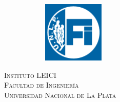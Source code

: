 \begin{titlepage}
\begin{center}
\begin{figure}[H]
\begin{subfigure}
                \end{subfigure}
                \begin{subfigure}
                    \centering
                    \includegraphics[width=0.32\textwidth]{Imagenes/FI Invertido.png}
                \end{subfigure}
            \end{figure}
            \vspace{1cm}
            \SemiBold\scshape
            Instituto LEICI
            \\
            \vspace{0.1cm}
            Facultad de Ingeniería
            \\
            \vspace{0.1cm}
            Universidad Nacional de La Plata
            \vspace{1cm}
        \end{center}
    \end{titlepage}
